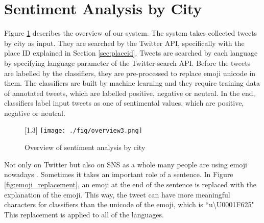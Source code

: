 \documentclass[twocolumn]{article}
\begin{document}
\vspace{-6mm}

\section{Sentiment Analysis by City}\label{sec:overview}
\vspace{-2mm}
Figure \ref{fig:overview} describes the overview of our system.
The system takes collected tweets by city as input.
They are searched by the Twitter API, specifically with the place ID explained in Section \ref{sec:placeid}.
Tweets are searched by each language by specifying language parameter of the Twitter search API.
Before the tweets are labelled by the classifiers, they are pre-processed to replace emoji unicode in them.
The classifiers are built by machine learning and they require training data of annotated tweets, which are labelled positive, negative or neutral.
In the end, classifiers label input tweets as one of sentimental values, which are positive, negative or neutral.

\begin{figure}
	\centering
	\scalebox{1.2}[1.3]{
	\texttt{[image: ./fig/overview3.png]}
	}
	\caption{Overview of sentiment analysis by city}
	\label{fig:overview}
\end{figure}

Not only on Twitter but also on SNS as a whole many people are using emoji nowadays \cite{emoji}.
Sometimes it takes an important role of a sentence.
In Figure \ref{fig:emoji_replacement}, an emoji at the end of the sentence is replaced with the explanation of the emoji.
This way, the tweet can have more meaningful characters for classifiers than the unicode of the emoji, which is ``u\textbackslash U0001F625"
This replacement is applied to all of the languages.
\end{document}

